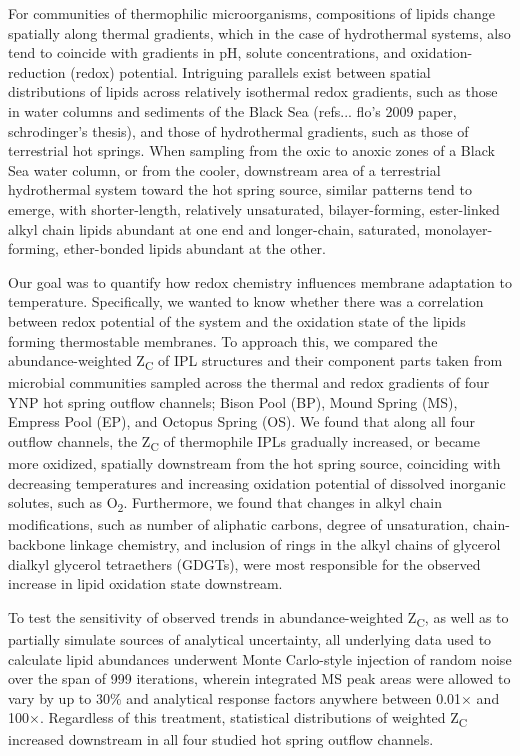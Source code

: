 For communities of thermophilic microorganisms, compositions of lipids change spatially along thermal gradients, which in the case of hydrothermal systems, also tend to coincide with gradients in pH, solute concentrations, and oxidation-reduction (redox) potential. Intriguing parallels exist between spatial distributions of lipids across relatively isothermal redox gradients, such as those in water columns and sediments of the Black Sea (refs... flo's 2009 paper, schrodinger's thesis), and those of hydrothermal gradients, such as those of terrestrial hot springs. When sampling from the oxic to anoxic zones of a Black Sea water column, or from the cooler, downstream area of a terrestrial hydrothermal system toward the hot spring source, similar patterns tend to emerge, with shorter-length, relatively unsaturated, bilayer-forming, ester-linked alkyl chain lipids abundant at one end and longer-chain, saturated, monolayer-forming, ether-bonded lipids abundant at the other.

Our goal was to quantify how redox chemistry influences membrane adaptation to temperature. Specifically, we wanted to know whether there was a correlation between redox potential of the system and the oxidation state of the lipids forming thermostable membranes. To approach this, we compared the abundance-weighted Z\textsubscript{C} of IPL structures and their component parts taken from microbial communities sampled across the thermal and redox gradients of four YNP hot spring outflow channels; Bison Pool (BP), Mound Spring (MS), Empress Pool (EP), and Octopus Spring (OS). We found that along all four outflow channels, the Z\textsubscript{C} of thermophile IPLs gradually increased, or became more oxidized, spatially downstream from the hot spring source, coinciding with decreasing temperatures and increasing oxidation potential of dissolved inorganic solutes, such as O\textsubscript{2}. Furthermore, we found that changes in alkyl chain modifications, such as number of aliphatic carbons, degree of unsaturation, chain-backbone linkage chemistry, and inclusion of rings in the alkyl chains of glycerol dialkyl glycerol tetraethers (GDGTs), were most responsible for the observed increase in lipid oxidation state downstream.

To test the sensitivity of observed trends in abundance-weighted Z\textsubscript{C}, as well as to partially simulate sources of analytical uncertainty, all underlying data used to calculate lipid abundances underwent Monte Carlo-style injection of random noise over the span of 999 iterations, wherein integrated MS peak areas were allowed to vary by up to 30\% and analytical response factors anywhere between 0.01$\times$ and 100$\times$. Regardless of this treatment, statistical distributions of weighted Z\textsubscript{C} increased downstream in all four studied hot spring outflow channels.


